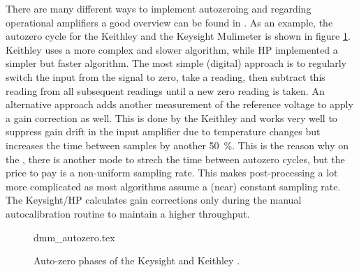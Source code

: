 There are many different ways to implement autozeroing and regarding operational amplifiers a good overview can be found in \cite{horowitz1989}. As an example, the autozero cycle for the Keithley  and the Keysight  Mulimeter is shown in figure \ref{fig:dmm_autozero_comparison}. Keithley uses a more complex and slower algorithm, while HP implemented a simpler but faster algorithm. The most simple (digital) approach is to regularly switch the input from the signal to zero, take a reading, then subtract this reading from all subsequent readings until a new zero reading is taken. An alternative approach adds another measurement of the reference voltage to apply a gain correction as well. This is done by the Keithley  and works very well to suppress gain drift in the input amplifier due to temperature changes but increases the time between samples by another \qty{50}{\percent}. This is the reason why on the , there is another mode to strech the time between autozero cycles, but the price to pay is a non-uniform sampling rate. This makes post-processing a lot more complicated as most algorithms assume a (near) constant sampling rate. The Keysight/HP  calculates gain corrections only during the manual autocalibration routine to maintain a higher throughput.

\begin{figure}[hb]
    \centering
        {dmm_autozero.tex}
    \caption{Auto-zero phases of the Keysight  and Keithley .}
    \label{fig:dmm_autozero_comparison}
\end{figure}

